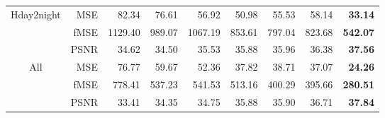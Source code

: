 \documentclass[runningheads]{llncs}
\begin{document}
\begin{table*}[t]
\begin{center}
\begin{tabular}{c|r|rrrrrr|r}
\midrule
\multirow{3}{*}{Hday2night}
& MSE  &  82.34 &  76.61 &  56.92 &  50.98 &  55.53 &  58.14 &  \textbf{33.14} \\
& fMSE &1129.40 & 989.07 &1067.19 & 853.61 & 797.04 & 823.68 & \textbf{542.07} \\
& PSNR   &  34.62 &  34.50 &  35.53 &  35.88 &  35.96 &  36.38 &  \textbf{37.56} \\
\midrule
\multirow{3}{*}{All}
& MSE  &  76.77 &  59.67 &  52.36 &  37.82 &  38.71 &  37.07 &  \textbf{24.26} \\
& fMSE & 778.41 & 537.23 & 541.53 & 513.16 & 400.29 & 395.66 & \textbf{280.51} \\
& PSNR   &  33.41 &  34.35 &  34.75 &  35.88 &  35.90 &  36.71 &  \textbf{37.84} \\
\bottomrule
\end{tabular}
\vspace{-0.5cm}
\end{center}
\end{table*}
\end{document}
